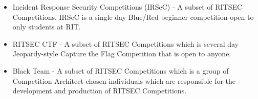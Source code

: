 \begin{itemize}
  \item Incident Response Security Competitions (IRSeC) - A subset of RITSEC 
    Competitions. IRSeC is a single day Blue/Red 
    beginner competition open to only students at RIT.

  \item RITSEC CTF - A subset of RITSEC Competitions which is several day
    Jeopardy-style Capture the Flag Competition that is open to anyone.
  
  \item Black Team - A subset of RITSEC Competitions which is a group of 
    Competition Architect chosen individuals which are responsible for the
    development and production of RITSEC Competitions.

\end{itemize}
